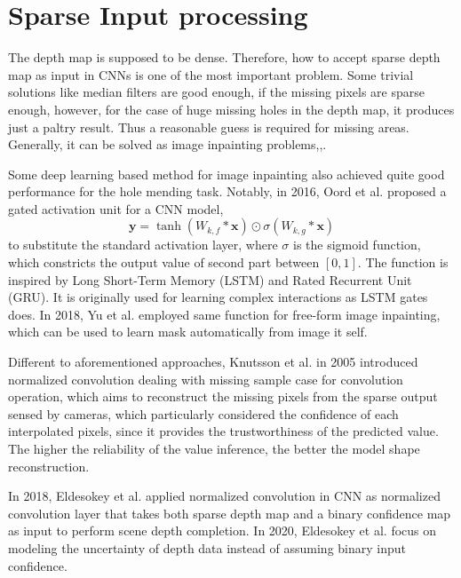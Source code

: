 

\section{Sparse Input processing}

The depth map is supposed to be dense. Therefore, how to accept sparse depth map as input in CNNs is one of the most important problem. Some trivial solutions like median filters are good enough, if the missing pixels are sparse enough, however, for the case of huge missing holes in the depth map, it produces just a paltry result. Thus a reasonable guess is required for missing areas. Generally, it can be solved as image inpainting problems,\cite{inpainting1},\cite{inpainting2}. 

Some deep learning based method for image inpainting also achieved quite good performance for the hole mending task. 
Notably, in 2016, Oord et al. \cite{gated_activation} proposed a gated activation unit for a CNN model,
\[\textbf{y} = \tanh (W_{k,f} * \textbf{x}) \odot \sigma (W_{k,g} * \textbf{x})\]
to substitute the standard activation layer, where $ \sigma $ is the sigmoid function, which constricts the output value of second part between $ [0,1] $.  The function is inspired by Long Short-Term Memory (LSTM) \cite{lstm} and Rated Recurrent Unit (GRU).\cite{gru} It is originally used for learning complex interactions as LSTM gates does. In 2018, Yu et al. \cite{gconv} employed same function for free-form image inpainting, which can be used to learn mask automatically from image it self.

Different to aforementioned approaches, Knutsson et al. in 2005 introduced normalized convolution \cite{nconv} dealing with missing sample case for convolution operation, which aims to reconstruct the missing pixels from the sparse output sensed by cameras, which particularly considered the confidence of each interpolated pixels, since it provides the trustworthiness of the predicted value. The higher the reliability of the value inference, the better the model shape reconstruction.

In 2018, Eldesokey et al. \cite{ncnn} applied normalized convolution in CNN as normalized convolution layer that takes both sparse depth map and a binary confidence map as input to perform scene depth completion.
In 2020, Eldesokey et al. \cite{pncnn} focus on modeling the uncertainty of depth data instead of assuming binary input confidence.

